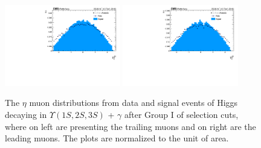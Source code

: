\begin{figure}[!htbp]
\begin{center}
\includegraphics[width=0.45\textwidth]{figures_and_tables/outputPlots/HtoUpsilon_Cat0_ZZZZZ/au/data_x_mc/noKinCuts/h_noKin_TrailingMu_eta}\hspace*{1.cm}
\includegraphics[width=0.45\textwidth]{figures_and_tables/outputPlots/HtoUpsilon_Cat0_ZZZZZ/au/data_x_mc/noKinCuts/h_noKin_LeadingMu_eta}
\end{center}\vspace*{-.5cm}
\caption{The $\eta$ muon distributions from data and signal events of Higgs decaying in $\Upsilon(1S,2S,3S)$ + $\gamma$ after Group I of selection cuts, where on left are presenting the trailing muons and on right are the leading muons. The plots are normalized to the unit of area.}
\label{fig:etaMuons_HtoUpsilon_Cat0}
\end{figure}

